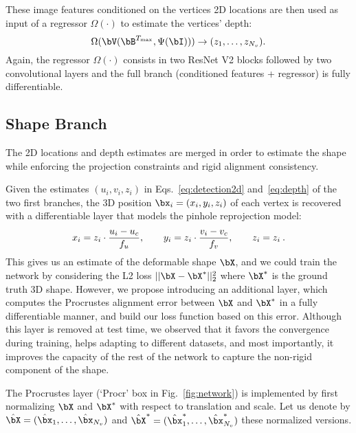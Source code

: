 \documentclass[10pt,twocolumn,letterpaper]{article}
\begin{document}
These image features conditioned on the vertices 2D locations are then used as input of a regressor $\Omega(\cdot)$ to estimate the vertices' depth:
\begin{equation}
\Omega(\bV(\bB^{T_{\textrm{max}}},\Psi(\bI))) \rightarrow (z_1,\ldots,z_{N_v}).
\label{eq:depth}
\end{equation}
Again, the regressor $\Omega(\cdot)$ consists in two ResNet V2 blocks followed by two convolutional layers and the full branch (conditioned features + regressor) is fully differentiable.



\subsection{Shape Branch} \label{sec:lifting}
The 2D locations and depth estimates are merged in order to estimate the shape while enforcing the projection constraints and rigid alignment consistency.

Given the estimates $(u_i, v_i,z_i)$ in Eqs.~\eqref{eq:detection2d} and~\eqref{eq:depth} of the two first branches, the 3D position $\bx_i= (x_i,y_i,z_i)$ of each vertex is recovered with a differentiable layer that models the pinhole reprojection model:
\begin{equation}
x_i=z_i\cdot\frac{u_i-u_c}{f_u}, \hspace{7mm} y_i=z_i\cdot\frac{v_i-v_c}{f_v}, \hspace{7mm} z_i = z_i \> .
\end{equation}
This gives us an estimate of the deformable shape $\bX$,   and we could train the network by considering the L2 loss $|| \bX - \bX^*||_2^2$ where $\bX^*$ is the ground truth 3D shape. However, we propose introducing an additional layer, which computes the  Procrustes alignment error between $\bX$ and $\bX^*$ in a fully differentiable manner, and build our loss function based on this error. Although this layer is removed at test time, we observed that it favors the convergence during training, helps adapting to different datasets, and most importantly, it improves the capacity of the rest of the network to capture the non-rigid component of the shape. 

The Procrustes layer (`Procr' box in Fig.~\ref{fig:network}) is implemented by first normalizing   $\bX$ and $\bX^*$ with respect to translation and scale. Let us denote by $\hat{\bX}=(\hat{\bx}_1,\ldots,\hat{\bx}_{N_v})$ and $\hat{\bX}^*=(\hat{\bx}_1^*,\ldots,\hat{\bx}_{N_v}^*)$ these normalized versions. 
\end{document}
